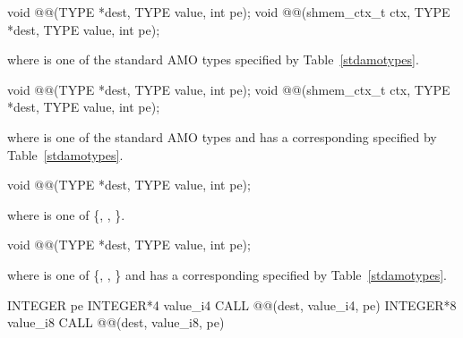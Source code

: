 
\begin{apidefinition}

\begin{C11synopsis}
void @@(TYPE *dest, TYPE value, int pe);
void @@(shmem_ctx_t ctx, TYPE *dest, TYPE value, int pe);
\end{C11synopsis}
where \TYPE{} is one of the standard \ac{AMO} types specified by
Table~\ref{stdamotypes}.

\begin{Csynopsis}
void @@(TYPE *dest, TYPE value, int pe);
void @@(shmem_ctx_t ctx, TYPE *dest, TYPE value, int pe);
\end{Csynopsis}
where \TYPE{} is one of the standard \ac{AMO} types and has a corresponding
\TYPENAME{} specified by Table~\ref{stdamotypes}.

\begin{DeprecateBlock}
\begin{C11synopsis}
void @@(TYPE *dest, TYPE value, int pe);
\end{C11synopsis}
where \TYPE{} is one of \{, , \}.

\begin{Csynopsis}
void @@(TYPE *dest, TYPE value, int pe);
\end{Csynopsis}
where \TYPE{} is one of \{, , \}
and has a corresponding \TYPENAME{} specified by Table~\ref{stdamotypes}.
\end{DeprecateBlock}

\begin{Fsynopsis}
INTEGER pe
INTEGER*4  value_i4
CALL @@(dest, value_i4, pe)
INTEGER*8 value_i8
CALL @@(dest, value_i8, pe)
\end{Fsynopsis}


\end{apidefinition}

